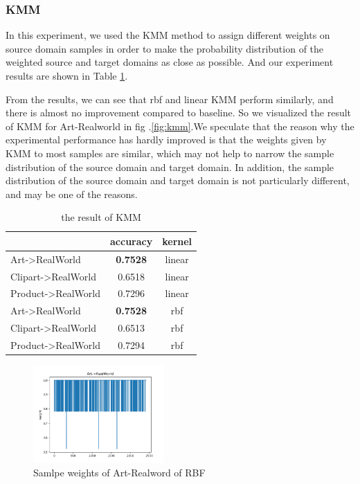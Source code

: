 \documentclass[conference]{IEEEtran}
\begin{document}
\subsubsection{KMM}
In this experiment, we used the KMM method to assign different weights on source domain samples in order to make the probability distribution of the weighted source and target domains as close as possible. And our experiment results are shown in Table \ref{tab:kmm}.\par
From the results, we can see that rbf and linear KMM perform similarly, and there is almost no improvement compared to baseline. So we visualized the result of KMM for Art-Realworld in fig .\ref{fig:kmm}.We speculate that the reason why the experimental performance has hardly improved is that the weights given by KMM to most samples are similar, which may not help to narrow the sample distribution of the source domain and target domain. In addition, the sample distribution of the source domain and target domain is not particularly different, and may be one of the reasons.
\begin{table}[H]
	\centering
	\caption{the result of KMM}
	\begin{tabular}{|l|c|c|}
		\hline
		\diagbox{dataset}{result} & accuracy  & kernel \\
		\hline
		Art->RealWorld & \textbf{0.7528} & linear \\
		\hline
		Clipart->RealWorld & 0.6518 & linear \\
		\hline
		Product->RealWorld & 0.7296 & linear \\
		\hline
		Art->RealWorld & \textbf{0.7528}  & rbf \\
		\hline
		Clipart->RealWorld & 0.6513 & rbf \\
		\hline
		Product->RealWorld & 0.7294 & rbf \\
		\hline
	\end{tabular}\label{tab:kmm}
\end{table}

\begin{center}
	\begin{figure}[H]
		\centering
		\includegraphics[width=5cm]{img/A_R_weight_rbf.png}
		\caption{Samlpe weights of Art-Realword of RBF}
	\end{figure}\label{fig:kmm}
\end{center}
\end{document}
